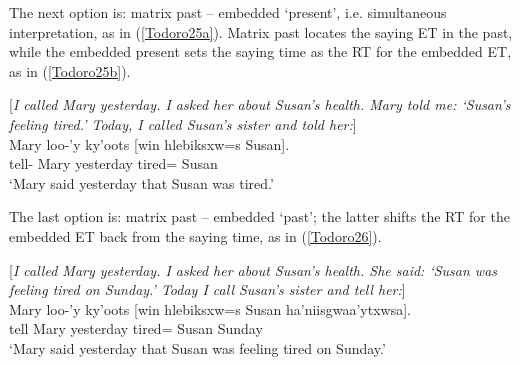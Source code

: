 \documentclass[output=paper]{langscibook}
\begin{document}
The next option is: matrix past – embedded ‘present’, i.e. simultaneous interpretation, as in (\ref{Todoro25a}). Matrix past locates the saying ET in the past, while the embedded present sets the saying time as the RT for the embedded ET, as in  (\ref{Todoro25b}). 

\begin{exe}
\ex \label{Todoro25}
\begin{xlist}

\ex \label{Todoro25a} [\emph{I called Mary yesterday. I asked her about Susan’s health. Mary    
    told me: `Susan’s feeling tired.' Today, I called Susan’s sister and   
     told her:}]\\
 	  {Mary}  {loo-’y}  {ky'oots}        [{win} {hlebiksxw=s} 	     {Susan}]. \\
    tell- Mary   yesterday  {} tired=	     Susan \\
\glt ‘Mary said yesterday that Susan was tired.’ 

\ex \label{Todoro25b}

\end{xlist}
\end{exe}

The last option is: matrix past – embedded ‘past’; the latter shifts the RT for the embedded ET back from the saying time, as in (\ref{Todoro26}). 

\begin{exe}
\ex \label{Todoro26}
\begin{xlist}

\ex \label{Todoro26a} [\emph{I called Mary yesterday. I asked her about Susan’s health. She   
     said: `Susan was feeling tired on Sunday.' Today I call Susan’s 
     sister and tell her:}]\\
 {Mary}  {loo-’y} {ky'oots} [{win} {hlebiksxw=s} {Susan} {ha’niisgwaa’ytxwsa}].  \\
    tell Mary  yesterday  tired= Susan Sunday \\
\glt ‘Mary said yesterday that Susan was feeling tired on Sunday.’ 

\ex \label{Todoro26b}

\end{xlist}
\end{exe}
\end{document}
